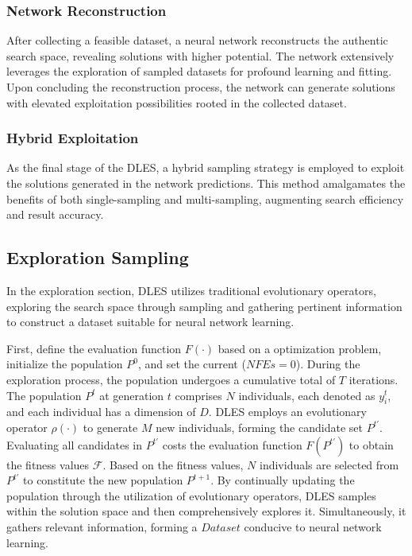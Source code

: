 \documentclass[journal,twoside]{IEEEtran}
\begin{document}
\subsubsection{Network Reconstruction}
After collecting a feasible dataset, a neural network reconstructs the authentic search space, revealing solutions with higher potential. The network extensively leverages the exploration of sampled datasets for profound learning and fitting. Upon concluding the reconstruction process, the network can generate solutions with elevated exploitation possibilities rooted in the collected dataset.
\subsubsection{Hybrid Exploitation}
As the final stage of the DLES, a hybrid sampling strategy is employed to exploit the solutions generated in the network predictions. This method amalgamates the benefits of both single-sampling and multi-sampling, augmenting search efficiency and result accuracy.


\subsection{Exploration Sampling}
In the exploration section, DLES utilizes traditional evolutionary operators, exploring the search space through sampling and gathering pertinent information to construct a dataset suitable for neural network learning.

First, define the evaluation function $F(\cdot)$ based on a optimization problem, initialize the population $P^{0}$, and set the current ($N\!F\!E\!s = 0$). During the exploration process, the population undergoes a cumulative total of $T$ iterations. The population $P^{t}$ at generation $t$ comprises $N$ individuals, each denoted as $y_{i}^{t}$, and each individual has a dimension of $D$. DLES employs an evolutionary operator $\rho(\cdot)$ to generate $M$ new individuals, forming the candidate set $P^{t'}$. Evaluating all candidates in $P^{t'}$ costs the evaluation function $F(P^{t'})$ to obtain the fitness values $\mathcal{F}$. Based on the fitness values, $N$ individuals are selected from $P^{t'}$ to constitute the new population $P^{t+1}$. By continually updating the population through the utilization of evolutionary operators, DLES samples within the solution space and then comprehensively explores it. Simultaneously, it gathers relevant information, forming a $Dataset$ conducive to neural network learning. 
\end{document}
